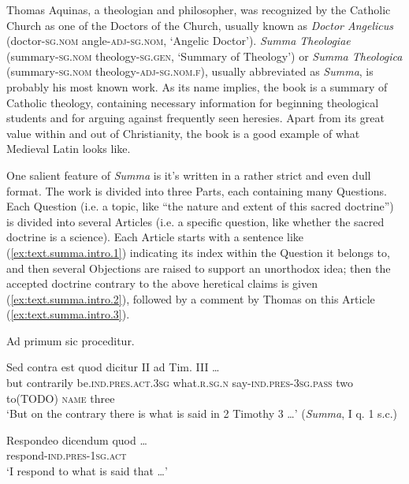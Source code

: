 \documentclass[a4paper, oneside, 12pt]{report}
\newcommand{\form}[1]{\emph{#1}}
\newcommand*{\category}[1]{\textsc{#1}}
\newcommand{\translate}[1]{`#1'}
\newcommand{\literature}[1]{\textit{#1}}
\begin{document}
Thomas Aquinas, a theologian and philosopher, 
was recognized by the Catholic Church 
as one of the Doctors of the Church,
usually known as \form{Doctor Angelicus} 
(doctor-\category{sg.nom} angle-\category{adj}-\category{sg.nom}, 
\translate{Angelic Doctor}).
\literature{Summa Theologiae}
(summary-\category{sg.nom} theology-\category{sg.gen}, \translate{Summary of Theology}) 
or \literature{Summa Theologica} 
(summary-\category{sg.nom} theology-\category{adj}-\category{sg.nom.f}),
usually abbreviated as \literature{Summa},
is probably his most known work.
As its name implies, the book is a summary of Catholic theology,
containing necessary information for 
beginning theological students 
and for arguing against frequently seen heresies. 
Apart from its great value within and out of Christianity, 
the book is a good example of 
what Medieval Latin looks like.

One salient feature of \literature{Summa} is 
it's written in a rather strict and even dull format.
The work is divided into three Parts,
each containing many Questions.
Each Question (i.e. a topic, like ``the nature and extent of this sacred doctrine'') 
is divided into several Articles 
(i.e. a specific question, like whether the sacred doctrine is a science).
Each Article starts with a sentence like (\ref{ex:text.summa.intro.1}) indicating its index 
within the Question it belongs to,
and then several Objections are raised 
to support an unorthodox idea;
then the accepted doctrine contrary to the above heretical claims is given
(\ref{ex:text.summa.intro.2}),
followed by a comment by Thomas on this Article (\ref{ex:text.summa.intro.3}).


\begin{exe}
    \ex\label{ex:text.summa.intro.1} Ad primum sic proceditur. 
    
    \ex\label{ex:text.summa.intro.2} 
    \gll Sed contra est quod dicitur II ad Tim. III \dots \\ 
    but contrarily be.\category{ind}.\category{pres}.\category{act}.\category{3sg} 
    what.\category{r}.\category{sg.n} 
    say-\category{ind.pres}-\category{3sg.pass} two to(TODO) \category{name} three \\
    \glt \translate{But on the contrary there is what is said in 2 Timothy 3 \dots} 
    (\literature{Summa}, I q. 1 s.c.)

    \ex\label{ex:text.summa.intro.3} 
    \gll Respondeo dicendum quod \dots \\
    respond-\category{ind.pres}-\category{1sg.act} \\
    \glt \translate{I respond to what is said that \dots}
\end{exe}



\end{document}
